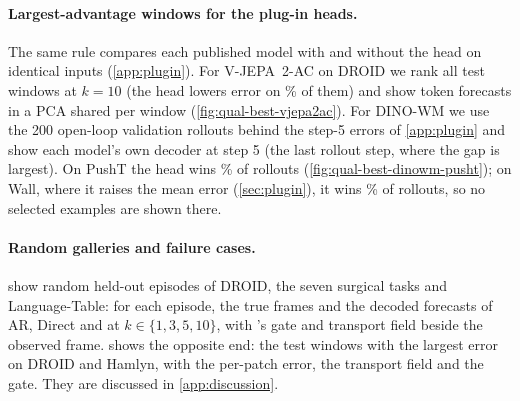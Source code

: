 \paragraph{Largest-advantage windows for the plug-in heads.} The same rule compares each published model with and without
the \ours{} head on identical inputs (\cref{app:plugin}). For V-JEPA~2-AC on DROID we rank all test windows at $k{=}10$
(the head lowers error on \qbWinVjepa\% of them) and show token forecasts in a PCA shared per window
(\cref{fig:qual-best-vjepa2ac}). For DINO-WM we use the 200 open-loop validation rollouts behind the step-5 errors of
\cref{app:plugin} and show each model's own decoder at step 5 (the last rollout step, where the gap is largest). On PushT the head
wins \qbWinPusht\% of rollouts (\cref{fig:qual-best-dinowm-pusht}); on Wall, where it raises the mean error
(\cref{sec:plugin}), it wins \qbWinWall\% of rollouts, so no selected examples are shown there.

\paragraph{Random galleries and failure cases.} 
show random held-out episodes of DROID, the seven surgical tasks and Language-Table: for each episode, the true frames
and the decoded forecasts of AR, Direct and \ours{} at $k\in\{1,3,5,10\}$, with \ours{}'s gate and transport field
beside the observed frame.  shows the opposite end: the test windows with the largest \ours{} error
on DROID and Hamlyn, with the per-patch error, the transport field and the gate. They are discussed in
\cref{app:discussion}.

